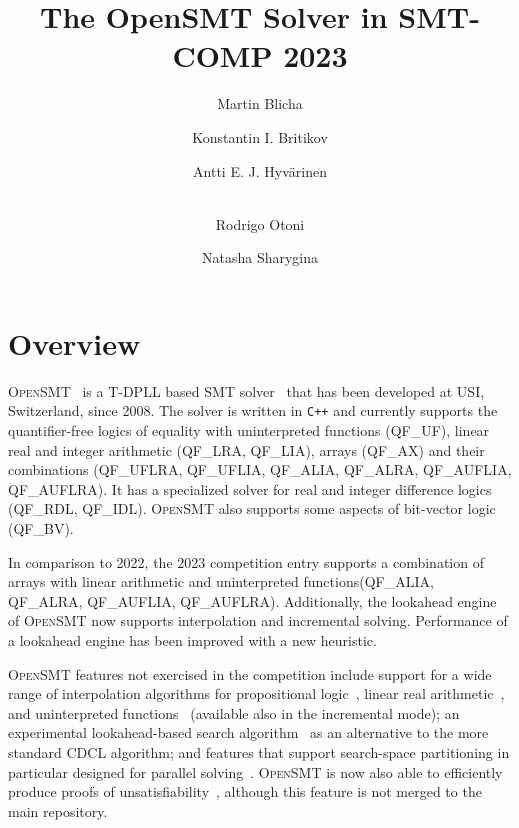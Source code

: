 \documentclass{easychair}
\title{The OpenSMT Solver in SMT-COMP 2023}
\author{
Martin Blicha\inst{1,3} \and
Konstantin I. Britikov\inst{1} \and
Antti E. J. Hyv{\"a}rinen\inst{2} \and\\
Rodrigo Otoni\inst{1} \and 
Natasha Sharygina\inst{1} \\
}
\institute{Universit{\`a} della Svizzera italiana (USI), Lugano,
Switzerland \and Certora \and Charles University, Prague, Czech Republic}
\date{}
\newcommand{\qflra}{QF\_LRA}
\newcommand{\qflia}{QF\_LIA}
\newcommand{\qfuf}{QF\_UF}
\newcommand{\qfbv}{QF\_BV}
\newcommand{\qfrdl}{QF\_RDL}
\newcommand{\qfidl}{QF\_IDL}
\newcommand{\qfuflra}{QF\_UFLRA}
\newcommand{\qfuflia}{QF\_UFLIA}
\newcommand{\qfax}{QF\_AX}
\newcommand{\qfauflia}{QF\_AUFLIA}
\newcommand{\qfauflra}{QF\_AUFLRA}
\newcommand{\qfalia}{QF\_ALIA}
\newcommand{\qfalra}{QF\_ALRA}
\newcommand{\opensmt}{\textsc{OpenSMT}\xspace}
\begin{document}
\maketitle

\section{Overview}

\opensmt~\cite{HyvarinenMAS16} is a T-DPLL based SMT
solver~\cite{NieuwenhuisOT:JACM06} that has been developed at USI,
Switzerland, since 2008.  The solver is written in {\tt C++} and
currently supports the quantifier-free logics of equality with
uninterpreted functions (\qfuf), linear real and integer arithmetic
(\qflra, \qflia), arrays (\qfax) and their combinations (\qfuflra, \qfuflia, \qfalia, \qfalra, \qfauflia, \qfauflra).
It has a specialized solver for real and integer difference logics (\qfrdl,
\qfidl). \opensmt also supports some aspects of bit-vector logic (\qfbv).

In comparison to 2022, the 2023 competition entry supports a combination of arrays with linear arithmetic and uninterpreted functions(\qfalia, \qfalra, \qfauflia, \qfauflra). 
Additionally, the lookahead engine of \opensmt now supports interpolation and incremental solving.
Performance of a lookahead engine has been improved with a new heuristic.

\opensmt features not exercised in the competition include support for a
wide range of interpolation algorithms for propositional
logic~\cite{AltFHS:VSTTE2015}, linear real
arithmetic~\cite{BlichaHKS19}, and uninterpreted
functions~\cite{AltHAS:FMCAD17} (available also in the incremental
mode); an experimental look\-ahead-based search
algorithm~\cite{HyvarinenMSCS18} as an alternative to the more standard
CDCL algorithm; and features that support search-space partitioning in
particular designed for parallel solving~\cite{HyvarinenMS:SAT15}.
\opensmt is now also able to efficiently produce proofs of
unsatisfiability~\cite{OtoniBEHS:DAC21}, although this feature is not merged to the main repository.

\iffalse %
\end{document}
